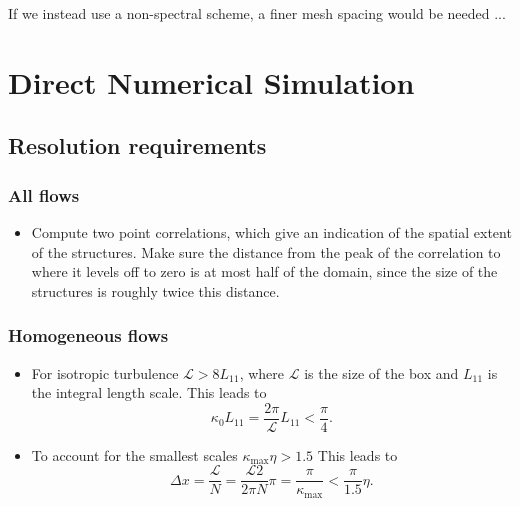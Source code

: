 \documentclass[oneside,a4paper,11pt]{report}
\begin{document}
If we instead use a non-spectral scheme, a finer mesh spacing would be needed ...


\chapter{Direct Numerical Simulation}

\section{Resolution requirements}

\subsection{All flows}
\begin{itemize}
\item Compute two point correlations, which give an indication of the spatial extent of the structures. Make sure the distance from the peak of the correlation to where it levels off to zero is at most half of the domain, since the size of the structures is roughly twice this distance.

\end{itemize}

\subsection{Homogeneous flows}
\begin{itemize}
\item For isotropic turbulence $\mathcal{L} > 8 L_{11}$, where $\mathcal{L}$ is the size of the box and $L_{11}$ is the integral length scale. This leads to
\begin{equation}
\kappa_0 L_{11} = \frac{2 \pi}{\mathcal{L}} L_{11} < \frac{\pi}{4} .
\end{equation}

\item To account for the smallest scales $\kappa_{\text{max}} \eta > 1.5$ This leads to
\begin{equation}
\Delta x = \frac{\mathcal{L}}{N} = \frac{ \mathcal{L}2 }{2\pi N} \pi = \frac{\pi}{\kappa_{\text{max}}} < \frac{\pi}{1.5} \eta .
\end{equation}
\end{itemize}
\end{document}
